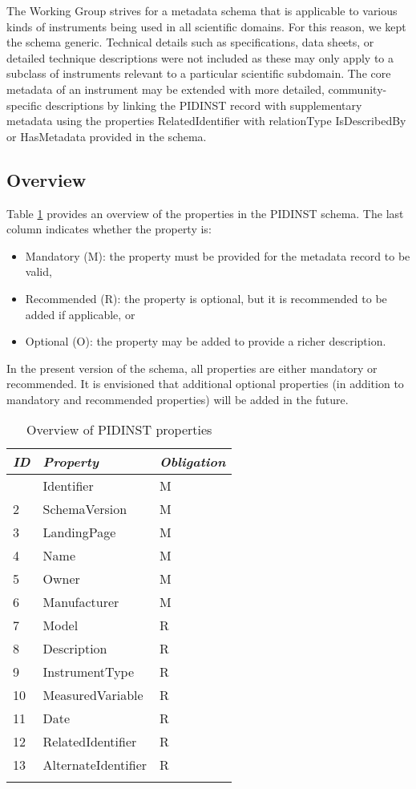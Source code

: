 \documentclass[titlepage=true,twoside=false,DIV=13]{scrartcl}
\begin{document}
The Working Group strives for a metadata schema that is applicable to
various kinds of instruments being used in all scientific domains.
For this reason, we kept the schema generic.  Technical details such
as specifications, data sheets, or detailed technique descriptions
were not included as these may only apply to a subclass of instruments
relevant to a particular scientific subdomain.  The core metadata of
an instrument may be extended with more detailed, community-specific
descriptions by linking the PIDINST record with supplementary metadata
using the properties RelatedIdentifier with relationType IsDescribedBy
or HasMetadata provided in the schema.

\subsection{Overview}

Table \ref{tab:schema:propoverview} provides an overview of the
properties in the PIDINST schema.  The last column indicates whether
the property is:
\begin{itemize}
\item Mandatory (M): the property must be provided for the metadata
  record to be valid,
\item Recommended (R): the property is optional, but it is recommended
  to be added if applicable, or
\item Optional (O): the property may be added to provide a richer
  description.
\end{itemize}
In the present version of the schema, all properties are either
mandatory or recommended.  It is envisioned that additional optional
properties (in addition to mandatory and recommended properties) will
be added in the future.

\begin{longtable}{|l|l|l|}
  \hline
  \emph{ID} & \emph{Property} & \emph{Obligation} \\
  \hline \endhead
  \hline \endfoot\endlastfoot
  1     & Identifier          & M \\
  2     & SchemaVersion       & M \\
  3     & LandingPage         & M \\
  4     & Name                & M \\
  5     & Owner               & M \\
  6     & Manufacturer        & M \\
  7     & Model               & R \\
  8     & Description         & R \\
  9     & InstrumentType      & R \\
  10    & MeasuredVariable    & R \\
  11    & Date                & R \\
  12    & RelatedIdentifier   & R \\
  13    & AlternateIdentifier & R \\
  \hline
  \caption{Overview of PIDINST properties}
  \label{tab:schema:propoverview}
\end{longtable}
\end{document}
